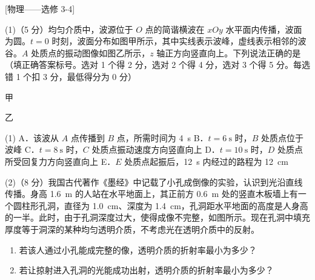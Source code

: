 \begin{question}
[物理——选修 3-4]

(1)（5 分）均匀介质中，波源位于 $O$ 点的简谐横波在 $xOy$ 水平面内传播，波面为圆。$t=0$ 时刻，波面分布如图甲所示，其中实线表示波峰，虚线表示相邻的波谷。$A$ 处质点的振动图像如图乙所示，$z$ 轴正方向竖直向上。下列说法正确的是\gkblank（填正确答案标号。选对 1 个得 2 分，选对 2 个得 4 分，选对 3 个得 5 分。每选错 1 个扣 3 分，最低得分为 0 分）


甲


乙

\begin{gkopts}(1)
  \task A．该波从 $A$ 点传播到 $B$ 点，所需时间为 \SI{4}{\second}
  \task B．$t=\SI{6}{\second}$ 时，$B$ 处质点位于波峰
  \task C．$t=\SI{8}{\second}$ 时，$C$ 处质点振动速度方向竖直向上
  \task D．$t=\SI{10}{\second}$ 时，$D$ 处质点所受回复力方向竖直向上
  \task E．$E$ 处质点起振后，\SI{12}{\second} 内经过的路程为 \SI{12}{\centi\metre}
\end{gkopts}

(2)（8 分）我国古代著作《墨经》中记载了小孔成倒像的实验，认识到光沿直线传播。身高 \SI{1.6}{\metre} 的人站在水平地面上，其正前方 \SI{0.6}{\metre} 处的竖直木板墙上有一个圆柱形孔洞，直径为 \SI{1.0}{\centi\metre}、深度为 \SI{1.4}{\centi\metre}，孔洞距水平地面的高度是人身高的一半。此时，由于孔洞深度过大，使得成像不完整，如图所示。现在孔洞中填充厚度等于洞深的某种均匀透明介质，不考虑光在透明介质中的反射。


\begin{enumerate}[leftmargin=2em, label=(\roman*)]
  \item 若该人通过小孔能成完整的像，透明介质的折射率最小为多少？
  \item 若让掠射进入孔洞的光能成功出射，透明介质的折射率最小为多少？
\end{enumerate}
\end{question}
